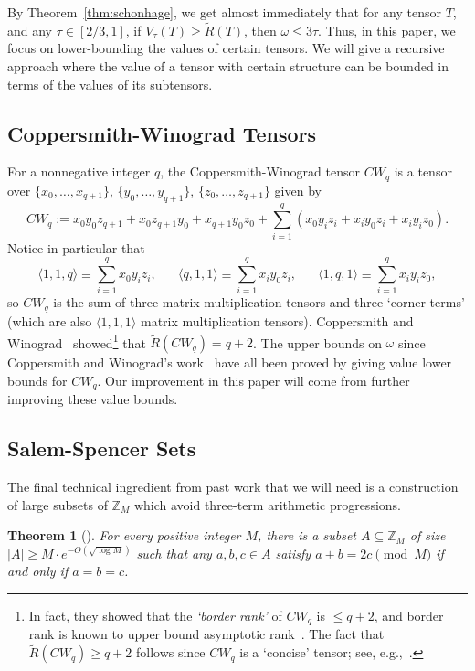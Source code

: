 \PassOptionsToPackage{shortlabels}{enumitem}\documentclass[10pt,a4paper]{article}
\newtheorem{theorem}{Theorem}[section]
\begin{document}
By Theorem~\ref{thm:schonhage}, we get almost immediately that for any tensor $T$, and any $\tau \in [2/3,1]$, if $V_\tau(T) \geq \tilde{R}(T)$, then $\omega \leq 3 \tau$. Thus, in this paper, we focus on lower-bounding the values of certain tensors. We will give a recursive approach where the value of a tensor with certain structure can be bounded in terms of the values of its subtensors.

\subsection{Coppersmith-Winograd Tensors}

For a nonnegative integer $q$, the Coppersmith-Winograd tensor $CW_q$ is a tensor over $\{x_0,\ldots,x_{q+1}\}$, $\{y_0, \ldots, y_{q+1}\}$, $\{z_0, \ldots, z_{q+1}\}$ given by $$CW_q := x_0 y_0 z_{q+1} + x_0 z_{q+1} y_0 + x_{q+1} y_0 z_0 + \sum_{i=1}^q (x_0 y_i z_i + x_i y_0 z_i + x_i y_i z_0).$$ 
Notice in particular that $$\langle 1,1,q \rangle \equiv \sum_{i=1}^q x_0 y_i z_i, \hspace{20pt} \langle q,1,1 \rangle \equiv \sum_{i=1}^q x_i y_0 z_i, \hspace{20pt} \langle 1,q,1 \rangle \equiv \sum_{i=1}^q x_i y_i z_0,$$
so $CW_q$ is the sum of three matrix multiplication tensors and three `corner terms' (which are also $\langle 1,1,1 \rangle$ matrix multiplication tensors). 
Coppersmith and Winograd~\cite{coppersmith} showed\footnote{In fact, they showed that the \emph{`border rank'} of $CW_q$ is $\leq q+2$, and border rank is known to upper bound asymptotic rank~\cite{bini1980border}. The fact that $\tilde{R}(CW_q) \geq q+2$ follows since $CW_q$ is a `concise' tensor; see, e.g.,~\cite[Remark 14.38]{burgisser2013algebraic}.} that $\tilde{R}(CW_q) = q+2$. The upper bounds on $\omega$ since Coppersmith and Winograd's work~\cite{coppersmith,stothers,v12,legall} have all been proved by giving value lower bounds for $CW_q$. Our improvement in this paper will come from further improving these value bounds.

\subsection{Salem-Spencer Sets}

The final technical ingredient from past work that we will need is a construction of large subsets of $\mathbb{Z}_M$ which avoid three-term arithmetic progressions.

\begin{theorem}[\cite{salemspencer,behrend1946sets}] \label{thm:SS}
For every positive integer $M$, there is a subset $A \subseteq \mathbb{Z}_M$ of size $|A| \geq M \cdot e^{-O(\sqrt{\log M})}$ such that any $a,b,c \in A$ satisfy $a+b=2c \pmod{M}$ if and only if $a=b=c$.
\end{theorem}
\end{document}
